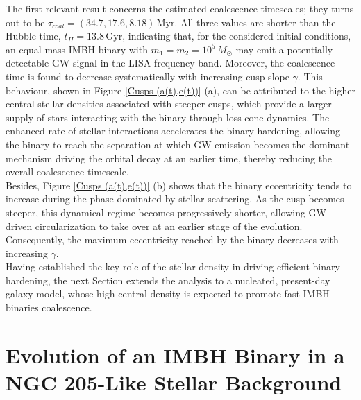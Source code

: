 \documentclass[12pt,twoside,openany]{book}
\begin{document}
The first relevant result concerns the estimated coalescence timescales; they turns out to be $\tau_{coal}=(34.7, 17.6,  8.18 )\,\mathrm{Myr}$. All three values are shorter than the Hubble time, $t_H=13.8\,\mathrm{Gyr}$, indicating that, for the considered initial conditions, an equal-mass IMBH binary with $m_1=m_2=10^5\,M_\odot$ may emit a potentially detectable GW signal in the LISA frequency band. Moreover, the coalescence time is found to decrease systematically with increasing cusp slope $\gamma$. This behaviour, shown in Figure \ref{Cusps (a(t),e(t))} (a), can be attributed to the higher central stellar densities associated with steeper cusps, which provide a larger supply of stars interacting with the binary through loss-cone dynamics. The enhanced rate of stellar interactions accelerates the binary hardening, allowing the binary to reach the separation at which GW emission becomes the dominant mechanism driving the orbital decay at an earlier time, thereby reducing the overall coalescence timescale.\\Besides, Figure \ref{Cusps (a(t),e(t))} (b) shows that the binary eccentricity tends to increase during the phase dominated by stellar scattering. As the cusp becomes steeper, this dynamical regime becomes progressively shorter, allowing GW-driven circularization to take over at an earlier stage of the evolution. Consequently, the maximum eccentricity reached by the binary decreases with increasing $\gamma$.\\Having established the key role of the stellar density in driving efficient binary hardening, the next Section extends the analysis to a nucleated, present-day galaxy model, whose high central density is expected to promote fast IMBH binaries coalescence.



















\section{Evolution of an IMBH Binary in a NGC 205-Like Stellar Background}
\label{sec:NGC 205 IMBH Binary evolution}
\end{document}
